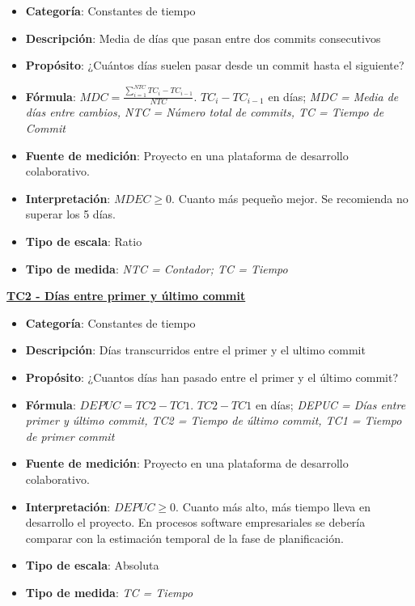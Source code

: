 \begin{itemize}
	\tightlist
	\item \textbf{Categoría}: Constantes de tiempo
	\item \textbf{Descripción}: Media de días que pasan entre dos commits consecutivos
	\item \textbf{Propósito}: ¿Cuántos días suelen pasar desde un commit hasta el siguiente?
	\item \textbf{Fórmula}: $MDC = \frac{\sum_{i=1}^{NTC} TC_i - TC_{i-1}}{NTC}$. $TC_i - TC_{i-1}$ en días; \textit{MDC = Media de días entre cambios, NTC = Número total de commits, TC = Tiempo de Commit}
	\item \textbf{Fuente de medición}: Proyecto en una plataforma de desarrollo colaborativo.
	\item \textbf{Interpretación}: $MDEC \geq 0$. Cuanto más pequeño mejor. Se recomienda no superar los 5 días.
	\item \textbf{Tipo de escala}: Ratio
	\item \textbf{Tipo de medida}: \textit{NTC = Contador; TC = Tiempo}
\end{itemize}
\textbf{\underline{TC2 - Días entre primer y último commit}}
\begin{itemize}
	\tightlist
	\item \textbf{Categoría}: Constantes de tiempo
	\item \textbf{Descripción}: Días transcurridos entre el primer y el ultimo commit 
	\item \textbf{Propósito}: ¿Cuantos días han pasado entre el primer y el último commit?
	\item \textbf{Fórmula}: $DEPUC = TC2- TC1$. $TC2- TC1$ en días;  \textit{DEPUC = Días entre primer y último commit, TC2 = Tiempo de último commit, TC1 = Tiempo de primer commit}
	\item \textbf{Fuente de medición}: Proyecto en una plataforma de desarrollo colaborativo.
	\item \textbf{Interpretación}: $DEPUC \geq 0$. Cuanto más alto, más tiempo lleva en desarrollo el proyecto. En procesos software empresariales se debería comparar con la estimación temporal de la fase de planificación. 
	\item \textbf{Tipo de escala}: Absoluta
	\item \textbf{Tipo de medida}: \textit{TC = Tiempo}
\end{itemize}
